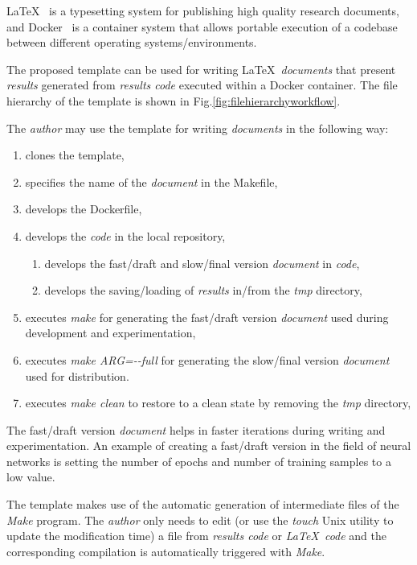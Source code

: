 \documentclass[journal]{IEEEtran}
\begin{document}
\LaTeX~\cite{lamport1994latex} is a typesetting system for publishing high quality research documents, and Docker~\cite{merkel2014docker} is a container system that allows portable execution of a codebase between different operating systems/environments.

The proposed template can be used for writing \LaTeX\ \textit{documents} that present \textit{results} generated from \textit{results code} executed within a Docker container.
The file hierarchy of the template is shown in Fig.\ref{fig:filehierarchyworkflow}.

The \textit{author} may use the template for writing \textit{documents} in the following way:
\begin{enumerate}
	\item clones the template,
	\item specifies the name of the \textit{document} in the Makefile,
	\item develops the Dockerfile,
	\item develops the \textit{code} in the local repository,
		\begin{enumerate}
			\item develops the fast/draft and slow/final version \textit{document} in \textit{code},
			\item develops the saving/loading of \textit{results} in/from the \textit{tmp} directory,
		\end{enumerate}
	\item executes \textit{make} for generating the fast/draft version \textit{document} used during development and experimentation,
	\item executes \textit{make ARG=-{}-full} for generating the slow/final version \textit{document} used for distribution.
	\item executes \textit{make clean} to restore to a clean state by removing the \textit{tmp} directory,
\end{enumerate}

The fast/draft version \textit{document} helps in faster iterations during writing and experimentation.
An example of creating a fast/draft version in the field of neural networks is setting the number of epochs and number of training samples to a low value.

The template makes use of the automatic generation of intermediate files of the \textit{Make} program.
The \textit{author} only needs to edit (or use the \textit{touch} Unix utility to update the modification time) a file from \textit{results code} or \textit{\LaTeX\ code} and the corresponding compilation is automatically triggered with \textit{Make}.
\end{document}
